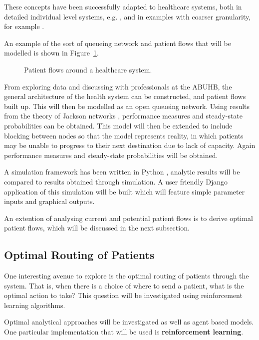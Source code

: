 \documentclass{article}
\begin{document}
These concepts have been successfully adapted to healthcare systems, both in detailed individual level systems, e.g. \cite{albinetal90}, \cite{creemerslambrecht07} and in examples with coarser granularity, for example \cite{koizumietal05}.

An example of the sort of queueing network and patient flows that will be modelled is shown in Figure~\ref{fig:healthsystem}.

\begin{figure}[H]
    
    \caption{Patient flows around a healthcare system.}
    \label{fig:healthsystem}
\end{figure}

From exploring data and discussing with professionals at the ABUHB, the general architecture of the health system can be constructed, and patient flows built up.
This will then be modelled as an open queueing network.
Using results from the theory of Jackson networks \cite{jackson57}, performance measures and steady-state probabilities can be obtained.
This model will then be extended to include blocking between nodes so that the model represents reality, in which patients may be unable to progress to their next destination due to lack of capacity.
Again performance measures and steady-state probabilities will be obtained.

A simulation framework has been written in Python \cite{http://www.python.org/},
analytic results will be compared to results obtained through simulation.
A user friendly Django application of this simulation will be built which will
feature simple parameter inputs and graphical outputs.

An extention of analysing current and potential patient flows is to derive optimal patient flows, which will be discussed in the next subsection.

\subsection{Optimal Routing of Patients}

One interesting avenue to explore is the optimal routing of patients through the system.
That is, when there is a choice of where to send a patient, what is the optimal action to take?
This question will be investigated using reinforcement learning algorithms.

Optimal analytical approaches will be investigated as well as agent based
models. One particular implementation that will be used is
\textbf{reinforcement learning}.
\end{document}
